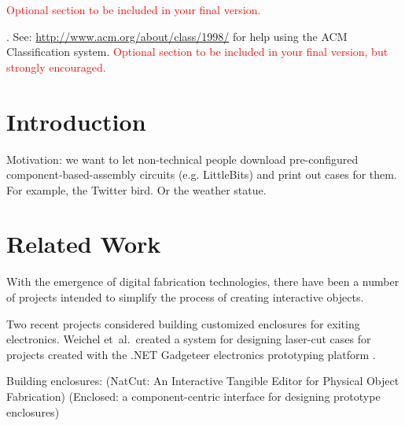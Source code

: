 \documentclass{chi-ext}
\title{\papertitle}
\author
{
  \alignauthor
	{
  	\textbf{First Author}\\
  	\affaddr{AuthorCo, Inc.}\\
  	\affaddr{123 Author Ave.}\\
  	\affaddr{Authortown, PA 54321 USA}\\
  	\email{author1@anotherco.com}
  }
  \vfil
  \alignauthor
	{
  	\textbf{Second Author}\\
  	\affaddr{AuthorCo, Inc.}\\
  	\affaddr{123 Author Ave.}\\
  	\affaddr{Authortown, PA 54321 USA}\\
  	\email{author2@anotherco.com}
  }
  \vfil
  \alignauthor
	{
  	\textbf{Third Author}\\
  	\affaddr{AuthorCo, Inc.}\\
  	\affaddr{123 Author Ave.}\\
  	\affaddr{Authortown, PA 54321 USA}\\
  	\email{author3@anotherco.com}
  }
}
\begin{document}
\maketitle

\begin{abstract}
	In this sample we describe the formatting requirements for various SIGCHI related submissions 
	and offer recommendations on writing for the worldwide SIGCHI readership. 
	Please review this document even if you have submitted to SIGCHI conferences before, 
	some format details have changed relative to previous years.
\end{abstract}

\keywords{}
\textcolor{red}{Optional section to be included in your final version.}

. 
See: \url{http://www.acm.org/about/class/1998/} 
for help using the ACM Classification system.
\textcolor{red}{Optional section to be included in your final version, but strongly encouraged.}


\section{Introduction}

	Motivation: we want to let non-technical people download
	pre-configured component-based-assembly circuits (e.g. LittleBits)
	and print out cases for them. For example, the Twitter bird. Or the
	weather statue.


\section{Related Work}

	With the emergence of digital fabrication technologies, there have
	been a number of projects intended to simplify the process of
	creating interactive objects.

	Two recent projects considered building customized enclosures for
	exiting electronics. Weichel et~al.\ created a system for designing
	laser-cut cases for projects created with the .NET
	Gadgeteer electronics prototyping platform \cite{Weichel:2013kn}.

	Building enclosures:
		\cite{Schneegass:2014ip} (NatCut: An Interactive Tangible Editor for
			Physical Object Fabrication)
		\cite{Weichel:2013kn} (Enclosed: a component-centric interface for
			designing prototype enclosures)
\end{document}
